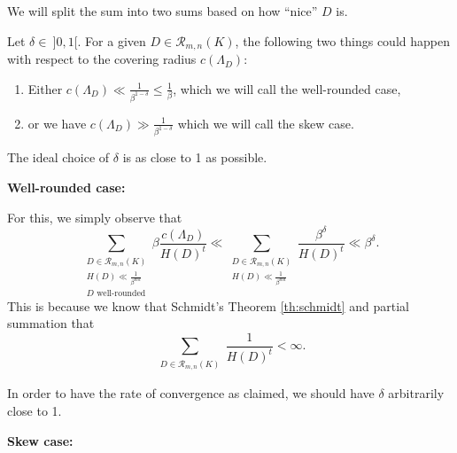 \documentclass{amsart}
\begin{document}
We will split the sum into two sums based on how ``nice'' $D$ is. 

Let $\delta \in~ ]0,1[$.
For a given $D \in \mathcal{R}_{m,n}(K)$, the following two things could happen with respect to the covering radius $c(\Lambda_{D})$: 
\begin{enumerate}
  \item 
Either $c(\Lambda_{D}) \ll  \frac{1}{\beta^{1-\delta}} \leq \frac{1}{\beta}$, which we will call the well-rounded case,
\item
or we have $  c(\Lambda_{D}) \gg   \tfrac{1}{\beta^{1-\delta}}$ which we will call the skew case. 
\end{enumerate}
The ideal choice of $\delta$ is as close to 1 as possible. 


{\bf Well-rounded case:}

For this, we simply observe that
\begin{equation}
	\sum_{\substack{D \in \mathcal{R}_{m,n}(K) \\   H(D) \ll \frac{1}{\beta^{md}} \\ D \text{ well-rounded}}}  \beta\frac{c(\Lambda_{D})}{H(D)^{t}}  \ll
	\sum_{\substack{D \in \mathcal{R}_{m,n}(K) \\   H(D) \ll \frac{1}{\beta^{md}}  }  }  \frac{\beta^{\delta} }{H(D)^{t} }   \ll \beta^{\delta}.
\end{equation}
This is because we know that Schmidt's Theorem \ref{th:schmidt} and partial summation that 
\begin{equation}
	\sum_{\substack{D \in \mathcal{R}_{m,n}(K)  }}  \frac{1}{H(D)^{t}}   < \infty.
\end{equation}

In order to have the rate of convergence as claimed, we should have $\delta$ arbitrarily close to 1.


{\bf Skew case:}
\end{document}

